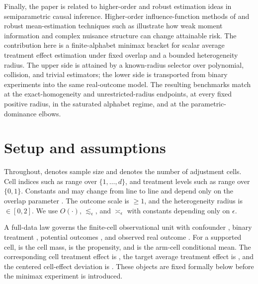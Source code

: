 \documentclass[11pt]{article}
\begin{document}
Finally, the paper is related to higher-order and robust estimation ideas in semiparametric causal inference. Higher-order influence-function methods of \citet{Robins2008,Robins2017} and robust mean-estimation techniques such as \citet{LugosiMendelson2019} illustrate how weak moment information and complex nuisance structure can change attainable risk. The contribution here is a finite-alphabet minimax bracket for scalar average treatment effect estimation under fixed overlap and a bounded heterogeneity radius. The upper side is attained by a known-radius selector over polynomial, collision, and trivial estimators; the lower side is transported from binary experiments into the same real-outcome model. The resulting benchmarks match at the exact-homogeneity and unrestricted-radius endpoints, at every fixed positive radius, in the saturated alphabet regime, and at the parametric-dominance elbows.


\section{Setup and assumptions}

Throughout,  denotes sample size and  denotes the number of adjustment cells. Cell indices such as  range over \(\{1,\ldots,d\}\), and treatment levels such as  range over \(\{0,1\}\). Constants  and  may change from line to line and depend only on the overlap parameter . The outcome scale is \(\ge 1\), and the heterogeneity radius is \(\in[0,2]\). We use \(O(\cdot)\), \(\lesssim_\epsilon\), and \(\asymp_\epsilon\) with constants depending only on \(\epsilon\).

A full-data law  governs the finite-cell observational unit with confounder , binary treatment , potential outcomes , and observed real outcome . For a supported cell,  is the cell mass,  is the propensity, and  is the arm-cell conditional mean. The corresponding cell treatment effect is , the target average treatment effect is , and the centered cell-effect deviation is . These objects are fixed formally below before the minimax experiment is introduced.
\end{document}
